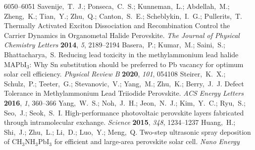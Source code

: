 \documentclass[journal=jpclcd,manuscript=letter]{achemso}
\begin{document}
\begin{mcitethebibliography}{49}
  6050--6051\relax
\mciteBstWouldAddEndPuncttrue
\mciteSetBstMidEndSepPunct{\mcitedefaultmidpunct}
{\mcitedefaultendpunct}{\mcitedefaultseppunct}\relax
\EndOfBibitem
{}
Savenije,~T.~J.; Ponseca,~C.~S.; Kunneman,~L.; Abdellah,~M.; Zheng,~K.;
  Tian,~Y.; Zhu,~Q.; Canton,~S.~E.; Scheblykin,~I.~G.; Pullerits,~T.
    Thermally Activated Exciton Dissociation and Recombination
  Control the Carrier Dynamics in Organometal Halide Perovskite. \emph{The
  Journal of Physical Chemistry Letters} \textbf{2014}, \emph{5},
  2189--2194\relax
\mciteBstWouldAddEndPuncttrue
\mciteSetBstMidEndSepPunct{\mcitedefaultmidpunct}
{\mcitedefaultendpunct}{\mcitedefaultseppunct}\relax
\EndOfBibitem
{}
Basera,~P.; Kumar,~M.; Saini,~S.; Bhattacharya,~S. Reducing lead toxicity in
  the methylammonium lead halide ${\mathrm{MAPbI}}_{3}$: Why Sn substitution
  should be preferred to Pb vacancy for optimum solar cell efficiency.
  \emph{Physical Review B} \textbf{2020}, \emph{101}, 054108\relax
\mciteBstWouldAddEndPuncttrue
\mciteSetBstMidEndSepPunct{\mcitedefaultmidpunct}
{\mcitedefaultendpunct}{\mcitedefaultseppunct}\relax
\EndOfBibitem
{}
Steirer,~K.~X.; Schulz,~P.; Teeter,~G.; Stevanovic,~V.; Yang,~M.; Zhu,~K.;
  Berry,~J.~J. Defect Tolerance in Methylammonium Lead Triiodide Perovskite.
  \emph{ACS Energy Letters} \textbf{2016}, \emph{1}, 360--366\relax
\mciteBstWouldAddEndPuncttrue
\mciteSetBstMidEndSepPunct{\mcitedefaultmidpunct}
{\mcitedefaultendpunct}{\mcitedefaultseppunct}\relax
\EndOfBibitem
{}
Yang,~W.~S.; Noh,~J.~H.; Jeon,~N.~J.; Kim,~Y.~C.; Ryu,~S.; Seo,~J.; Seok,~S.~I.
  High-performance photovoltaic perovskite layers fabricated through
  intramolecular exchange. \emph{Science} \textbf{2015}, \emph{348},
  1234--1237\relax
\mciteBstWouldAddEndPuncttrue
\mciteSetBstMidEndSepPunct{\mcitedefaultmidpunct}
{\mcitedefaultendpunct}{\mcitedefaultseppunct}\relax
\EndOfBibitem
{}
Huang,~H.; Shi,~J.; Zhu,~L.; Li,~D.; Luo,~Y.; Meng,~Q. Two-step ultrasonic
  spray deposition of ${\mathrm{CH}}_{3}{\mathrm{NH}}_{3}{\mathrm{PbI}}_{3}$
  for efficient and large-area perovskite solar cell. \emph{Nano Energy}

\end{mcitethebibliography}
\end{document}
